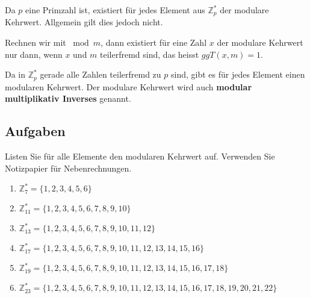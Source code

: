 Da $p$ eine Primzahl ist, existiert für jedes Element aus $\mathbb{Z}_p^*$ der modulare Kehrwert. Allgemein gilt dies jedoch nicht.

\begin{theorem}
	Rechnen wir mit $\bmod m$, dann existiert für eine Zahl $x$ der modulare Kehrwert nur dann, wenn $x$ und $m$ teilerfremd sind, das heisst $ggT(x, m) = 1$. 
\end{theorem}

Da in $\mathbb{Z}_p^*$ gerade alle Zahlen teilerfremd zu $p$ sind, gibt es für jedes Element einen modularen Kehrwert. Der modulare Kehrwert wird auch \textbf{modular multiplikativ Inverses} genannt.

\subsection{Aufgaben}

Listen Sie für alle Elemente den modularen Kehrwert auf. Verwenden Sie Notizpapier für Nebenrechnungen.

\begin{enumerate}
	\item $\mathbb{Z}_{7}^* = \{1, 2, 3, 4, 5, 6\}$
	
	\fillwithgrid{2in}
	
	\item $\mathbb{Z}_{11}^* = \{1, 2, 3, 4, 5, 6, 7, 8, 9, 10\}$
	
	\fillwithgrid{2in}
	
	\item $\mathbb{Z}_{13}^* = \{1, 2, 3, 4, 5, 6, 7, 8, 9, 10, 11, 12\}$
	
	\fillwithgrid{2in}
	
	\item $\mathbb{Z}_{17}^* = \{1, 2, 3, 4, 5, 6, 7, 8, 9, 10, 11, 12, 13, 14, 15, 16\}$
	
	\fillwithgrid{2in}
	
	\item $\mathbb{Z}_{19}^* = \{1, 2, 3, 4, 5, 6, 7, 8, 9, 10, 11, 12, 13, 14, 15, 16, 17, 18\}$
	
	\fillwithgrid{2in}
	
	\item $\mathbb{Z}_{23}^* = \{1, 2, 3, 4, 5, 6, 7, 8, 9, 10, 11, 12, 13, 14, 15, 16, 17, 18, 19, 20, 21, 22\}$
	
	\fillwithgrid{2in}
\end{enumerate}
